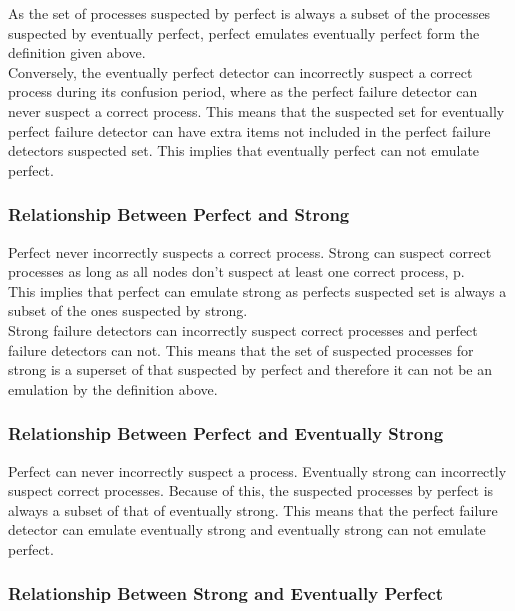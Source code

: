 \documentclass{article}
\begin{document}
As the set of processes suspected by perfect is always a subset of the processes suspected by eventually perfect, perfect emulates eventually perfect form the definition given above.\\

Conversely,  the eventually perfect detector can incorrectly suspect a correct process during its confusion period, where as the perfect failure detector can never suspect a correct process.  This means that the suspected set for eventually perfect failure detector can have extra items not included in the perfect failure detectors suspected set.  This implies that eventually perfect can not emulate perfect. 

\subsubsection{Relationship Between Perfect and Strong}

Perfect never incorrectly suspects a correct process.  Strong can suspect correct processes as long as all nodes don't suspect at least one correct process, p.\\

This implies that perfect can emulate strong as perfects suspected set is always a subset of the ones suspected by strong.\\

Strong failure detectors can incorrectly suspect correct processes and perfect failure detectors can not.  This means that the set of suspected processes for strong is a superset of that suspected by perfect and therefore it can not be an emulation by the definition above.

\subsubsection{Relationship Between Perfect and Eventually Strong}

Perfect can never incorrectly suspect a process.  Eventually strong can incorrectly suspect correct processes.  Because of this, the suspected processes by perfect is always a subset of that of eventually strong.  This means that the perfect failure detector can emulate eventually strong and eventually strong can not emulate perfect.

\subsubsection{Relationship Between Strong and Eventually Perfect}
\end{document}
